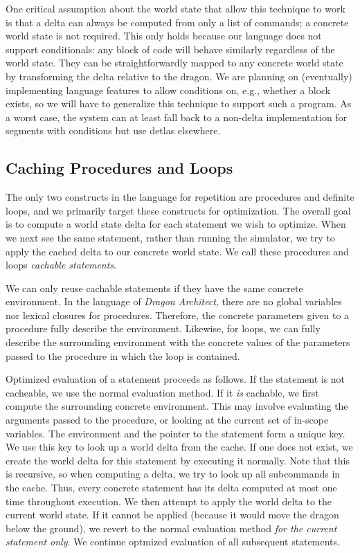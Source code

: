\documentclass{sig-alternate}
\newcommand{\da}{\emph{Dragon Architect}}
\begin{document}
One critical assumption about the world state that allow this technique to work is that a delta can always be computed from only a list of commands; a concrete world state is not required. This only holds because our language does not support conditionals: any block of code will behave similarly regardless of the world state. They can be straightforwardly mapped to any concrete world state by transforming the delta relative to the dragon. We are planning on (eventually) implementing language features to allow conditions on, e.g., whether a block exists, so we will have to generalize this technique to support such a program. As a worst case, the system can at least fall back to a non-delta implementation for segments with conditions but use detlas elsewhere.

\subsection{Caching Procedures and Loops}

The only two constructs in the language for repetition are procedures and definite loops, and we primarily target these constructs for optimization. The overall goal is to compute a world state delta for each statement we wish to optimize. When we next see the same statement, rather than running the simulator, we try to apply the cached delta to our concrete world state. We call these procedures and loops \emph{cachable statements}.

We can only reuse cachable statements if they have the same concrete environment. In the language of \da{}, there are no global variables nor lexical closures for procedures. Therefore, the concrete parameters given to a procedure fully describe the environment. Likewise, for loops, we can fully describe the surrounding environment with the concrete values of the parameters passed to the procedure in which the loop is contained.

Optimized evaluation of a statement proceeds as follows. If the statement is not cacheable, we use the normal evaluation method. If it \emph{is} cachable, we first compute the surrounding concrete environment. This may involve evaluating the arguments passed to the procedure, or looking at the current set of in-scope variables. The environment and the pointer to the statement form a unique key. We use this key to look up a world delta from the cache. If one does not exist, we create the world delta for this statement by executing it normally. Note that this is recursive, so when computing a delta, we try to look up all subcommands in the cache. Thus, every concrete statement has its delta computed at most one time throughout execution. We then attempt to apply the world delta to the current world state. If it cannot be applied (because it would move the dragon below the ground), we revert to the normal evaluation method \emph{for the current statement only}. We continue optmized evaluation of all subsequent statements. 
\end{document}
